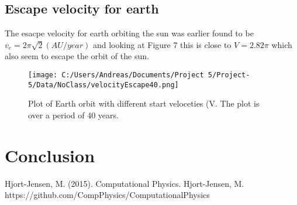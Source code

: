\documentclass[twoside,twocolumn]{article}
\begin{document}
\subsection{Escape velocity for earth}

The esacpe velocity for earth orbiting the sun was earlier found to be $v_e = 2\pi \sqrt{2} (AU/year)$ and looking at Figure 7 this is close to $V = 2.82\pi$ which also seem to escape the orbit of the sun.
\begin{figure}[H]  \texttt{[image: C:/Users/Andreas/Documents/Project 5/Project-5/Data/NoClass/velocityEscape40.png]}
  \caption{Plot of Earth orbit with different start veloceties (V. The plot is over a period of 40 years.}
  \label{fig:boat2}
\end{figure}

\section{Conclusion}


\begin{thebibliography}{99} %
Hjort-Jensen, M. (2015).
\newblock Computational Physics.
Hjort-Jensen, M.
\newblock https://github.com/CompPhysics/ComputationalPhysics

 
\end{thebibliography}

\end{document}
